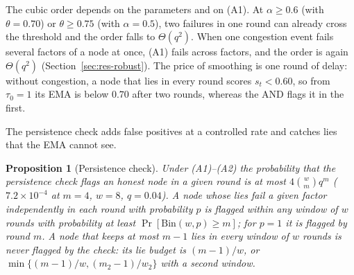 \documentclass[lineno,pdflatex,sn-nature]{sn-jnl}
\theoremstyle{thmstyleone}%
\newtheorem{proposition}{Proposition}%
\theoremstyle{thmstylethree}%
\begin{document}
The cubic order depends on the parameters and on (A1).  At
$\alpha\geq0.6$ (with $\theta=0.70$) or $\theta\geq0.75$ (with
$\alpha=0.5$), two failures in one round can already cross the
threshold and the order falls to $\Theta(q^{2})$.  When one congestion event fails several
factors of a node at once, (A1) fails across factors, and the order is
again $\Theta(q^{2})$ (Section~\ref{sec:res-robust}).  The price of
smoothing is one round of delay: without congestion, a node that lies
in every round scores $s_t<0.60$, so from $\tau_0=1$ its EMA is below
$0.70$ after two rounds, whereas the AND flags it in the first.

The persistence check adds false positives at a controlled rate and
catches lies that the EMA cannot see.

\begin{proposition}[Persistence check]\label{prop:persist}
Under (A1)--(A2) the probability that the persistence check flags an
honest node in a given round is at most
$4\binom{w}{m}q^{m}$ ($7.2\times10^{-4}$ at $m=4$, $w=8$, $q=0.04$).
A node whose lies fail a given factor independently in each round with
probability $p$ is flagged within any window of $w$ rounds with
probability at least $\Pr[\mathrm{Bin}(w,p)\geq m]$; for $p=1$ it is
flagged by round $m$.  A node that keeps at most $m-1$ lies in every
window of $w$ rounds is never flagged by the check: its \emph{lie
budget} is $(m-1)/w$, or $\min\{(m-1)/w,(m_2-1)/w_2\}$ with a second
window.
\end{proposition}

\end{document}
